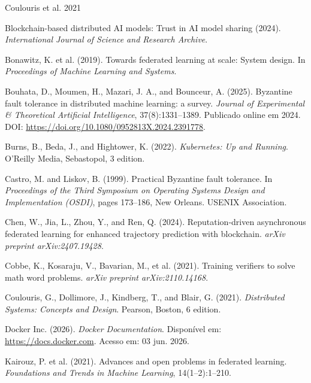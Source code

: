 \documentclass[12pt]{article}
\begin{document}
\begin{thebibliography}{Coulouris et al. 2021}

Blockchain-based distributed AI models: Trust in AI model sharing (2024). \textit{International Journal of Science and Research Archive}.

Bonawitz, K. et al. (2019). Towards federated learning at scale: System design. In \textit{Proceedings of Machine Learning and Systems}.

Bouhata, D., Moumen, H., Mazari, J. A., and Bounceur, A. (2025). Byzantine fault tolerance in distributed machine learning: a survey. \textit{Journal of Experimental \& Theoretical Artificial Intelligence}, 37(8):1331--1389. Publicado online em 2024. DOI: \url{https://doi.org/10.1080/0952813X.2024.2391778}.

Burns, B., Beda, J., and Hightower, K. (2022). \textit{Kubernetes: Up and Running}. O'Reilly Media, Sebastopol, 3 edition.

Castro, M. and Liskov, B. (1999). Practical Byzantine fault tolerance. In \textit{Proceedings of the Third Symposium on Operating Systems Design and Implementation (OSDI)}, pages 173--186, New Orleans. USENIX Association.

Chen, W., Jia, L., Zhou, Y., and Ren, Q. (2024). Reputation-driven asynchronous federated learning for enhanced trajectory prediction with blockchain. \textit{arXiv preprint arXiv:2407.19428}.

Cobbe, K., Kosaraju, V., Bavarian, M., et al. (2021). Training verifiers to solve math word problems. \textit{arXiv preprint arXiv:2110.14168}.

Coulouris, G., Dollimore, J., Kindberg, T., and Blair, G. (2021). \textit{Distributed Systems: Concepts and Design}. Pearson, Boston, 6 edition.

Docker Inc. (2026). \textit{Docker Documentation}. Disponível em: \url{https://docs.docker.com}. Acesso em: 03 jun. 2026.

Kairouz, P. et al. (2021). Advances and open problems in federated learning. \textit{Foundations and Trends in Machine Learning}, 14(1--2):1--210.


\end{thebibliography}
\end{document}
